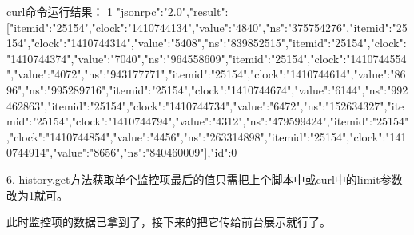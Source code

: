 curl命令运行结果：
1
{"jsonrpc":"2.0","result":[{"itemid":"25154","clock":"1410744134","value":"4840","ns":"375754276"},{"itemid":"25154","clock":"1410744314","value":"5408","ns":"839852515"},{"itemid":"25154","clock":"1410744374","value":"7040","ns":"964558609"},{"itemid":"25154","clock":"1410744554","value":"4072","ns":"943177771"},{"itemid":"25154","clock":"1410744614","value":"8696","ns":"995289716"},{"itemid":"25154","clock":"1410744674","value":"6144","ns":"992462863"},{"itemid":"25154","clock":"1410744734","value":"6472","ns":"152634327"},{"itemid":"25154","clock":"1410744794","value":"4312","ns":"479599424"},{"itemid":"25154","clock":"1410744854","value":"4456","ns":"263314898"},{"itemid":"25154","clock":"1410744914","value":"8656","ns":"840460009"}],"id":0}




6.     history.get方法获取单个监控项最后的值只需把上个脚本中或curl中的limit参数改为1就可。


此时监控项的数据已拿到了，接下来的把它传给前台展示就行了。
